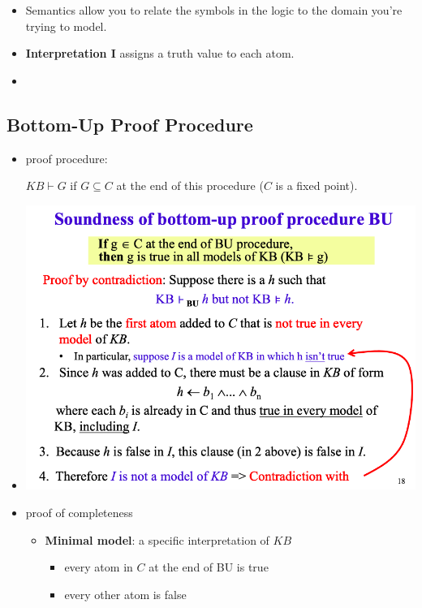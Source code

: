\documentclass{article}
\begin{document}
\begin{itemize}
    \item Semantics allow you to relate the symbols in the logic to the domain you're trying to model.
    \item \textbf{Interpretation I} assigns a truth value to each atom.
    \item 
\end{itemize}

\subsection{Bottom-Up Proof Procedure}

\begin{itemize}
    \item proof procedure:
    \begin{algorithmic}
        \Repeat
    \end{algorithmic}
    
    $KB \vdash G$ if $G \subseteq C$ at the end of this procedure ($C$ is a fixed point).
    \item 
    \includegraphics[scale=0.45]{soundness_of_bu}
    \item proof of completeness
        \begin{itemize}
            \item \textbf{Minimal model}: a specific interpretation of $KB$
                \begin{itemize}
                    \item every atom in $C$ at the end of BU is true
                    \item every other atom is false
                \end{itemize}
        \end{itemize}
\end{itemize}
\end{document}

